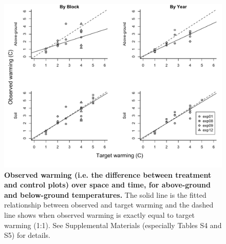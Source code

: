 \documentclass{article}
\begin{document}
 \begin{figure}[p]
   \centering
 \includegraphics{../Analyses/figures/blockyearvar.pdf}  
 \caption{\textbf{Observed warming (i.e. the difference between treatment and control plots) over space and time, for above-ground and below-ground temperatures.} The solid line is the fitted relationship between observed and target warming and the dashed line shows when observed warming is exactly equal to target warming (1:1). See Supplemental Materials (especially Tables S4 and S5) for details.}
 \label{fig:blockyear}
 \end{figure}
 \clearpage
 
\end{document}
